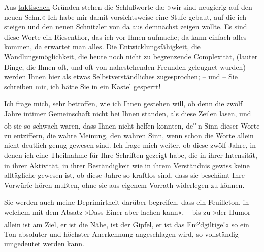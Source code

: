 \pstart
           Aus \uline{taktischen} Gründen stehen die Schlußworte da:
                  »wir sind neugierig auf den
                  neuen Schn.« Ich habe mir damit vorsichtsweise eine Stufe gebaut, auf die ich
               steigen und den neuen Schnitzler von da aus demnächst zeigen wollte. Es sind diese
               Worte ein Riesenthor, das ich vor Ihnen aufmache; da kann einfach alles kommen, da
               erwartet man alles. Die Entwicklungsfähigkeit, die Wandlungsmöglichkeit, die heute
               noch nicht zu begrenzende Complexität, (lauter Dinge, die Ihnen oft, und oft von
               nahestehenden Freunden geleugnet wurden) werden Ihnen hier als etwas
               Selbstverständliches zugesprochen; – und – Sie schreiben
                  \textcolor{gray}{m}i\textcolor{gray}{r}, ich hätte Sie in ein Kastel
               gesperrt!\pend
           
\pstart
           Ich frage mich, sehr betroffen, wie ich Ihnen gestehen will, ob denn die zwölf Jahre
               intimer Gemeinschaft nicht bei Ihnen standen, als \label{K_L03353-8v}\label{K_L03353-8} diese Zeilen lasen, und ob sie so
               schwach waren,  dass \label{K_L03353-9v}\label{K_L03353-9} Ihnen nicht helfen konnten, de\substVorne{}\textsuperscript{m}\substDazwischen{}n\substHinten{} Sinn dieser Worte zu entziffern, die wahre Meinung, den wahren Sinn, wenn
               schon die Worte allein nicht deutlich genug gewesen sind. Ich frage mich weiter, ob
               diese zwölf Jahre, in denen ich eine Theilnahme für Ihre Schriften gezeigt habe, die
               in ihrer Intensität, in ihrer Aktivität, in ihrer Beständigkeit wie in ihrem
               Verständnis gewiss keine alltägliche gewesen ist, ob diese Jahre so kraftlos sind,
               dass sie beschämt Ihre Vorwürfe hören mußten, ohne sie aus eigenem Vorrath widerlegen
               zu können.\pend
           
\pstart
           Sie werden auch meine Deprimirtheit darüber begreifen, dass ein Feuilleton, in welchem mit dem Absatz »Dass Einer aber lachen kann«, –
               bis zu »der Humor allein ist am
                  Ziel, er ist die Nähe, ist der Gipfel, er ist das En\substVorne{}\textsuperscript{gi}\substDazwischen{}dg\substHinten{}iltige!« so ein Ton absoluter und höchster Anerkennung angeschlagen
               wird, so vollständig umgedeutet werden kann.\pend
           
